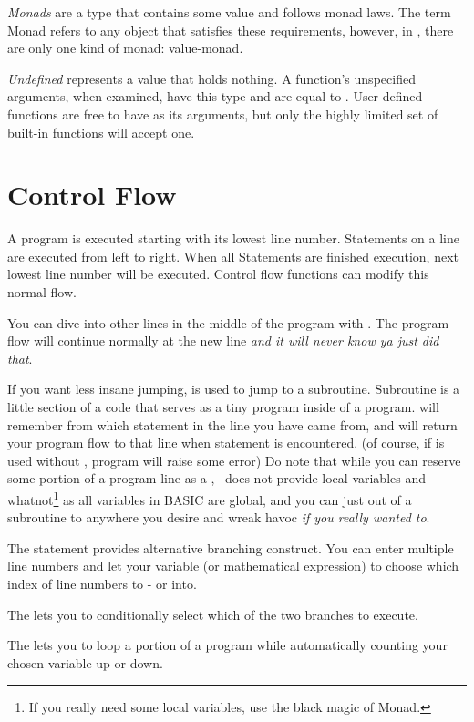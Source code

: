 \emph{Monads} are a type that contains some value and follows monad laws. The term Monad refers to any object that satisfies these requirements, however, in \tbas, there are only one kind of monad: value-monad.

\emph{Undefined} represents a value that holds nothing. A function's unspecified arguments, when examined, have this type and are equal to . User-defined functions are free to have  as its arguments, but only the highly limited set of built-in functions will accept one.

\section{Control Flow}

A program is executed starting with its lowest line number. Statements on a line are executed from left to right. When all Statements are finished execution, next lowest line number will be executed. Control flow functions can modify this normal flow.

You can dive into other lines in the middle of the program with . The program flow will continue normally at the new line \emph{and it will never know ya just did that}.

If you want less insane jumping,  is used to jump to a subroutine. Subroutine is a little section of a code that serves as a tiny program inside of a program.  will remember from which statement in the line you have came from, and will return your program flow to that line when  statement is encountered. (of course, if  is used without , program will raise some error) Do note that while you can reserve some portion of a program line as a , \tbas\ does not provide local variables and whatnot\footnote{If you really need some local variables, use the black magic of Monad.} as all variables in BASIC are global, and you can just  out of a subroutine to anywhere you desire and wreak havoc \emph{if you really wanted to}.

The  statement provides alternative branching construct. You can enter multiple line numbers and let your variable (or mathematical expression) to choose which index of line numbers to - or  into.

The  lets you to conditionally select which of the two branches to execute.

The  lets you to loop a portion of a program while automatically counting your chosen variable up or down.
